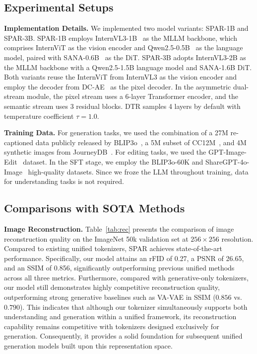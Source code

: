 \documentclass[runningheads]{llncs}
\begin{document}
\subsection{Experimental Setups}
\noindent\textbf{Implementation Details.}
We implemented two model variants: SPAR-1B and SPAR-3B. SPAR-1B employs InternVL3-1B~\cite{zhu2025internvl3} as the MLLM backbone, which comprises InternViT as the vision encoder and Qwen2.5-0.5B~\cite{qwen2025qwen25technicalreport} as the language model, paired with SANA-0.6B~\cite{xie2024sana} as the DiT. SPAR-3B adopts InternVL3-2B as the MLLM backbone with a Qwen2.5-1.5B language model and SANA-1.6B DiT. Both variants reuse the InternViT from InternVL3 as the vision encoder and employ the decoder from DC-AE~\cite{chen2024deep} as the pixel decoder. In the asymmetric dual-stream module, the pixel stream uses a 6-layer Transformer encoder, and the semantic stream uses 3 residual blocks. DTR samples 4 layers by default with temperature coefficient $\tau=1.0$.

\noindent\textbf{Training Data.} For generation tasks, we used the combination of a 27M re-captioned data publicly released by BLIP3o~\cite{chen2025blip3}, a 5M subset of CC12M~\cite{changpinyo2021conceptual}, and 4M synthetic images from JourneyDB~\cite{sun2023journeydb}. For editing tasks, we used the GPT-Image-Edit~\cite{wang2025gpt} dataset. In the SFT stage, we employ the BLIP3o-60K and ShareGPT-4o-Image~\cite{chen2025sharegpt4oimg} high-quality datasets. Since we froze the LLM throughout training, data for understanding tasks is not required.

\subsection{Comparisons with SOTA Methods}

\noindent\textbf{Image Reconstruction.}
Table~\ref{tab:rec} presents the comparison of image reconstruction quality on the ImageNet 50k validation set at $256 \times 256$ resolution. Compared to existing unified tokenizers, SPAR achieves state-of-the-art performance. Specifically, our model attains an rFID of 0.27, a PSNR of 26.65, and an SSIM of 0.856, significantly outperforming previous unified methods across all three metrics. Furthermore, compared with generative-only tokenizers, our model still demonstrates highly competitive reconstruction quality, outperforming strong generative baselines such as VA-VAE in SSIM ($0.856$ vs. $0.790$). 
This indicates that although our tokenizer simultaneously supports both understanding and generation within a unified framework, its reconstruction capability remains competitive with tokenizers designed exclusively for generation. Consequently, it provides a solid foundation for subsequent unified generation models built upon this representation space.
\end{document}
